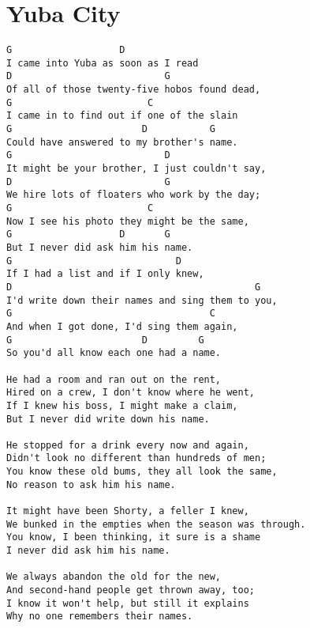 \documentclass[leqno]{memoir}
\begin{document}
\chapter{Yuba City}
\begin{verbatim}
G                   D
I came into Yuba as soon as I read
D                           G
Of all of those twenty-five hobos found dead,
G                        C
I came in to find out if one of the slain
G                       D           G
Could have answered to my brother's name.
G                           D
It might be your brother, I just couldn't say,
D                           G
We hire lots of floaters who work by the day;
G                        C
Now I see his photo they might be the same,
G                   D       G
But I never did ask him his name.
G                             D
If I had a list and if I only knew,
D                                           G
I'd write down their names and sing them to you,
G                                   C
And when I got done, I'd sing them again,
G                       D         G
So you'd all know each one had a name.

He had a room and ran out on the rent,
Hired on a crew, I don't know where he went,
If I knew his boss, I might make a claim,
But I never did write down his name.

He stopped for a drink every now and again,
Didn't look no different than hundreds of men;
You know these old bums, they all look the same,
No reason to ask him his name.

It might have been Shorty, a feller I knew,
We bunked in the empties when the season was through.
You know, I been thinking, it sure is a shame
I never did ask him his name.

We always abandon the old for the new,
And second-hand people get thrown away, too;
I know it won't help, but still it explains
Why no one remembers their names. 
\end{verbatim}
\newpage
\end{document}

